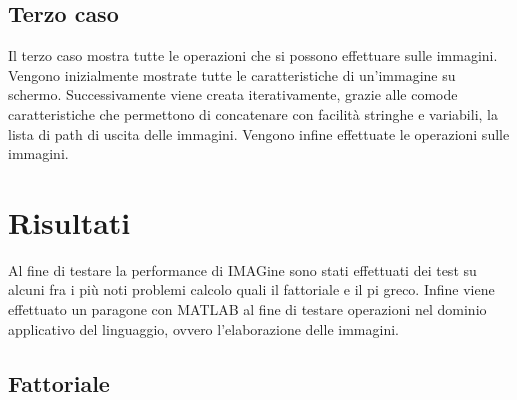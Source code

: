 \documentclass[10pt]{article}
\begin{document}
\subsection{Terzo caso}
Il terzo caso mostra tutte le operazioni che si possono effettuare sulle immagini. Vengono inizialmente mostrate tutte le caratteristiche di un'immagine su schermo. Successivamente viene creata iterativamente, grazie alle comode caratteristiche che permettono di concatenare con facilità stringhe e variabili, la lista di path di uscita delle immagini. Vengono infine effettuate le operazioni sulle immagini.



\clearpage
\section{Risultati}
Al fine di testare la performance di IMAGine sono stati effettuati dei test su alcuni fra i più noti problemi calcolo quali il fattoriale e il pi greco. Infine viene effettuato un paragone con MATLAB al fine di testare operazioni nel dominio applicativo del linguaggio, ovvero l'elaborazione delle immagini.

\subsection{Fattoriale}




\end{document}
